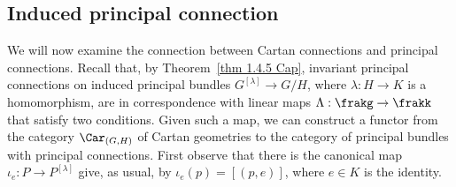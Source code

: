\subsection{Induced principal connection}



We will now examine the connection between Cartan connections and principal connections. Recall that, by Theorem~\ref{thm 1.4.5 Cap}, invariant principal connections on induced principal bundles $G^{[\lambda]}\to G\slash H$, where $\lambda:H\to K$ is a homomorphism, are in correspondence with linear maps $\Lambda:\frakg\to\frakk$ that satisfy two conditions. Given such a map, we can construct a functor from the category $\Car_{(G,H)}$ of Cartan geometries to the category of principal bundles with principal connections. First observe that there is the canonical map $\iota_e:P\to P^{[\lambda]}$ give, as usual, by $\iota_e(p)=[(p,e)]$, where $e\in K$ is the identity. 


